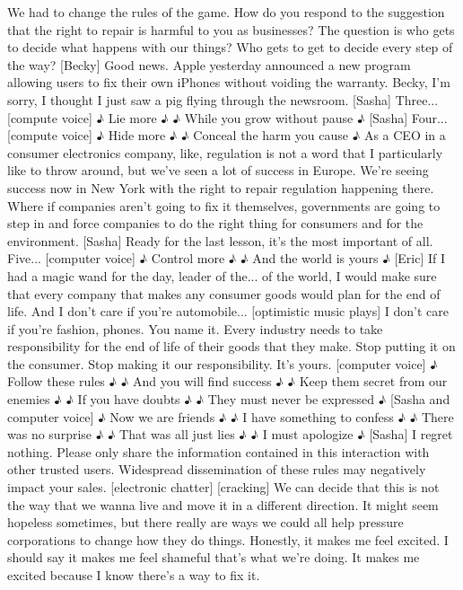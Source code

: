 \documentclass[a4paper]{article}
\begin{document}
	We had to change the rules of the game.
	How do you respond to the suggestion
	that the right to repair is harmful to you as businesses?
	The question is who gets to decide what happens with our things?
	Who gets to get to decide every step of the way?
	[Becky] Good news.
	Apple yesterday announced a new program allowing users
	to fix their own iPhones without voiding the warranty.
	Becky, I'm sorry, I thought I just saw a pig flying through the newsroom.
	[Sasha] Three...
	[compute voice] ♪ Lie more ♪
	♪ While you grow without pause ♪
	[Sasha] Four...
	[compute voice] ♪ Hide more ♪
	♪ Conceal the harm you cause ♪
	As a CEO in a consumer electronics company,
	like, regulation is not a word that I particularly like to throw around,
	but we've seen a lot of success in Europe.
	We're seeing success now in New York
	with the right to repair regulation happening there.
	Where if companies aren't going to fix it themselves,
	governments are going to step in and force companies to do
	the right thing for consumers and for the environment.
	[Sasha] Ready for the last lesson, it's the most important of all.
	Five...
	[computer voice] ♪ Control more ♪
	♪ And the world is yours ♪
	[Eric] If I had a magic wand for the day,
	leader of the... of the world,
	I would make sure that every company that makes any consumer goods
	would plan for the end of life.
	And I don't care if you're automobile...
	[optimistic music plays]
	I don't care if you're fashion,
	phones.
	You name it.
	Every industry needs to take responsibility
	for the end of life of their goods that they make.
	Stop putting it on the consumer.
	Stop making it our responsibility.
	It's yours.
	[computer voice] ♪ Follow these rules ♪
	♪ And you will find success ♪
	♪ Keep them secret from our enemies ♪
	♪ If you have doubts ♪
	♪ They must never be expressed ♪
	[Sasha and computer voice] ♪ Now we are friends ♪
	♪ I have something to confess ♪
	♪ There was no surprise ♪
	♪ That was all just lies ♪
	♪ I must apologize ♪
	[Sasha] I regret nothing.
	Please only share the information contained in this interaction
	with other trusted users.
	Widespread dissemination of these rules may negatively impact your sales.
	[electronic chatter]
	[cracking]
	We can decide that this is not the way that we wanna live
	and move it in a different direction.
	It might seem hopeless sometimes, but there really are ways
	we could all help pressure corporations to change how they do things.
	Honestly, it makes me feel excited.
	I should say it makes me feel shameful that's what we're doing.
	It makes me excited because I know there's a way to fix it.
\end{document}

